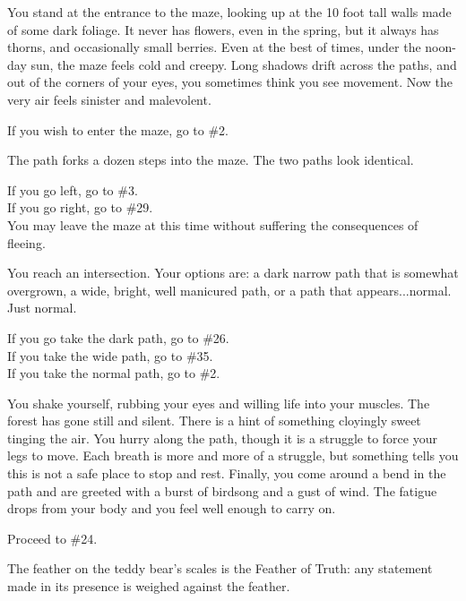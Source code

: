 \documentclass[white]{gl2018}
\begin{document}
\begin{large}
\begin{location}{1}
You stand at the entrance to the maze, looking up at the 10 foot tall walls made of some dark foliage. It never has flowers, even in the spring, but it always has thorns, and occasionally small berries. Even at the best of times, under the noon-day sun, the maze feels cold and creepy. Long shadows drift across the paths, and out of the corners of your eyes, you sometimes think you see movement. Now the very air feels sinister and malevolent. 

\begin{fromhere}If you wish to enter the maze, go to \#2.\end{fromhere}
\end{location}
\begin{location}{2}
The path forks a dozen steps into the maze. The two paths look identical.  
\begin{fromhere}
If you go left, go to \#3. \\
If you go right, go to \#29.\\
You may leave the maze at this time without suffering the consequences of fleeing.
\end{fromhere}
\end{location}
\begin{location}{3}
You reach an intersection. Your options are: a dark narrow path that is somewhat overgrown, a wide, bright, well manicured path, or a path that appears...normal.  Just normal.

\begin{fromhere}
 If you go take the dark path, go to \#26.\\
 If you take the wide path, go to \#35.\\
 If you take the normal path, go to \#2.
\end{fromhere}
\end{location}
\begin{location}{4}
You shake yourself, rubbing your eyes and willing life into your muscles.  The forest has gone still and silent.  There is a hint of something cloyingly sweet tinging the air.  You hurry along the path, though it is a struggle to force your legs to move.  Each breath is more and more of a struggle, but something tells you this is not a safe place to stop and rest.  Finally,  you come around a bend in the path and are greeted with a burst of birdsong and a gust of wind.  The fatigue drops from your body and you feel well enough to carry on.  
\begin{fromhere}
Proceed to \#24.
\end{fromhere}
\end{location}
\begin{location}{5}
The feather on the teddy bear's scales is the Feather of Truth: any statement made in its presence is weighed against the feather.  


\end{location}
\end{large}
\end{document}
